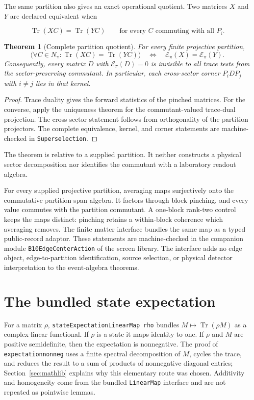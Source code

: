 \documentclass[11pt]{article}
\renewcommand{\_}{\textunderscore\allowbreak}
\newtheorem{theorem}{Theorem}
\theoremstyle{remark}
\newcommand{\Tr}{\operatorname{Tr}}
\newcommand{\pinch}{\mathcal E}
\begin{document}
The same partition also gives an exact operational quotient. Two matrices
$X$ and $Y$ are declared equivalent when

\[
 \Tr(XC)=\Tr(YC)
 \qquad\text{for every }C\text{ commuting with all }P_i.
\]

\begin{theorem}[Complete partition quotient]
\label{thm:partition-operational-quotient}
For every finite projective partition,
\[
 \bigl(\forall C\in N_\pi:\Tr(XC)=\Tr(YC)\bigr)
 \quad\Longleftrightarrow\quad
 \pinch_\pi(X)=\pinch_\pi(Y).
\]
Consequently, every matrix $D$ with $\pinch_\pi(D)=0$ is invisible to all
trace tests from the sector-preserving commutant. In particular, each cross-sector corner
$P_iDP_j$ with $i\ne j$ lies in that kernel.
\end{theorem}

\begin{proof}
Trace duality gives the forward statistics of the pinched matrices. For the
converse, apply the uniqueness theorem for the commutant-valued trace-dual
projection. The cross-sector statement follows from orthogonality of the
partition projectors. The complete equivalence, kernel, and corner statements
are machine-checked in \texttt{Superselection}.
\end{proof}

The theorem is relative to a supplied partition. It neither constructs a
physical sector decomposition nor identifies the commutant with a laboratory
readout algebra.

For every supplied projective partition, averaging maps surjectively onto the
commutative partition-span algebra. It factors through block pinching, and
every value commutes with the partition commutant. A one-block rank-two
control keeps the maps distinct: pinching retains a within-block coherence
which averaging removes. The finite matter interface bundles the same map as
a typed public-record adaptor. These statements are machine-checked in
the companion module \texttt{B10EdgeCenterAction} of the screen library. The interface adds no edge object,
edge-to-partition identification, source selection, or physical detector
interpretation to the event-algebra theorems.

\section{The bundled state expectation}
\label{sec:functional}

For a matrix $\rho$, \texttt{stateExpectationLinearMap rho} bundles
$M\mapsto\Tr(\rho M)$ as a complex-linear functional. If $\rho$ is a state it
maps identity to one. If $\rho$ and $M$ are positive semidefinite, then the
expectation is nonnegative. The proof of
\texttt{expectation\_nonneg} uses a finite spectral decomposition of $M$,
cycles the trace, and reduces the result to a sum of products of nonnegative
diagonal entries; Section~\ref{sec:mathlib} explains why this elementary
route was chosen. Additivity and homogeneity come from the bundled
\texttt{LinearMap} interface and are not repeated as pointwise lemmas.
\end{document}
